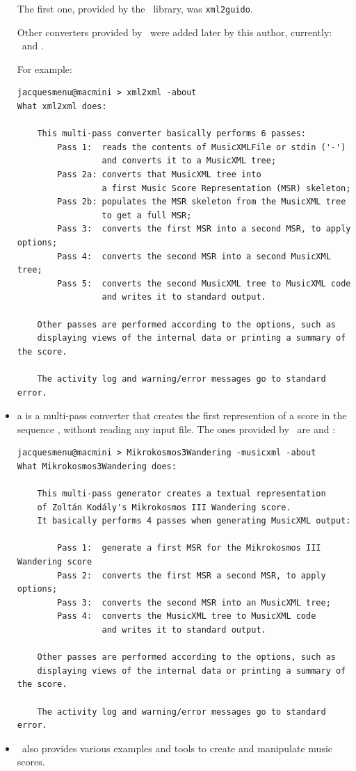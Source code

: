 \begin{itemize}
The first one, provided by the \libmusicxml\ library, was {\tt xml2guido}.

Other converters provided by \mf\ were added later by this author, currently: \xmlToLy\, \xmlToBrl\, \xmlToXml\ and \xmlToGuido. 

For example:
\begin{lstlisting}[language=Terminal]
jacquesmenu@macmini > xml2xml -about
What xml2xml does:

    This multi-pass converter basically performs 6 passes:
        Pass 1:  reads the contents of MusicXMLFile or stdin ('-')
                 and converts it to a MusicXML tree;
        Pass 2a: converts that MusicXML tree into
                 a first Music Score Representation (MSR) skeleton;
        Pass 2b: populates the MSR skeleton from the MusicXML tree
                 to get a full MSR;
        Pass 3:  converts the first MSR into a second MSR, to apply options;
        Pass 4:  converts the second MSR into a second MusicXML tree;
        Pass 5:  converts the second MusicXML tree to MusicXML code
                 and writes it to standard output.

    Other passes are performed according to the options, such as
    displaying views of the internal data or printing a summary of the score.

    The activity log and warning/error messages go to standard error.
\end{lstlisting}

\item a  is a multi-pass converter that creates the first represention of a score in the sequence , without reading any input file. The ones provided by \mf\ are  and :
\begin{lstlisting}[language=Terminal]
jacquesmenu@macmini > Mikrokosmos3Wandering -musicxml -about
What Mikrokosmos3Wandering does:

    This multi-pass generator creates a textual representation
    of Zoltán Kodály's Mikrokosmos III Wandering score.
    It basically performs 4 passes when generating MusicXML output:

        Pass 1:  generate a first MSR for the Mikrokosmos III Wandering score
        Pass 2:  converts the first MSR a second MSR, to apply options;
        Pass 3:  converts the second MSR into an MusicXML tree;
        Pass 4:  converts the MusicXML tree to MusicXML code
                 and writes it to standard output.

    Other passes are performed according to the options, such as
    displaying views of the internal data or printing a summary of the score.

    The activity log and warning/error messages go to standard error.
\end{lstlisting}


\item \mf\ also provides various examples and tools to create and manipulate music scores.%
\end{itemize}

